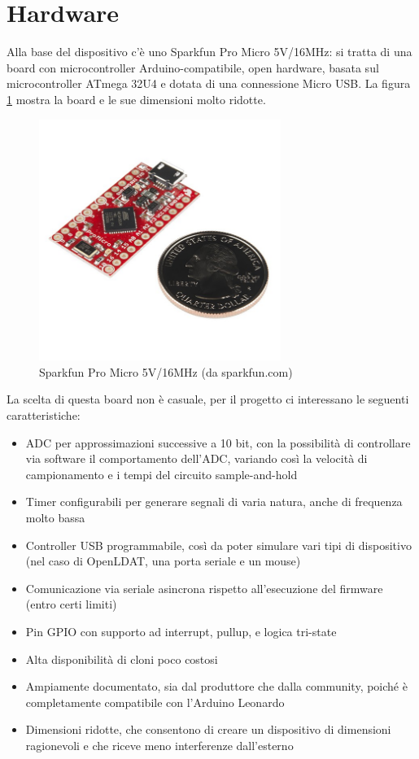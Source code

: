 \section{Hardware}
Alla base del dispositivo c'è uno Sparkfun Pro Micro 5V/16MHz: si tratta di una board con microcontroller Arduino-compatibile, open hardware, basata sul microcontroller ATmega 32U4 e dotata di una connessione Micro USB. La figura \ref{fig:sparkfun_promicro} mostra la board e le sue dimensioni molto ridotte.
\begin{figure}[h]
	\centering
	\includegraphics[width=0.7\textwidth]{Dispositivo_files/sparkfun_promicro.jpg}
	\caption{Sparkfun Pro Micro 5V/16MHz (da sparkfun.com)}
	\label{fig:sparkfun_promicro}
\end{figure}

La scelta di questa board non è casuale, per il progetto ci interessano le seguenti caratteristiche:
\begin{itemize}
	\item ADC per approssimazioni successive a 10 bit, con la possibilità di controllare via software il comportamento dell'ADC, variando così la velocità di campionamento e i tempi del circuito sample-and-hold
	\item Timer configurabili per generare segnali di varia natura, anche di frequenza molto bassa
	\item Controller USB programmabile, così da poter simulare vari tipi di dispositivo (nel caso di OpenLDAT, una porta seriale e un mouse)
	\item Comunicazione via seriale asincrona rispetto all'esecuzione del firmware (entro certi limiti)
	\item Pin GPIO con supporto ad interrupt, pullup, e logica tri-state
	\item Alta disponibilità di cloni poco costosi
	\item Ampiamente documentato, sia dal produttore che dalla community, poiché è completamente compatibile con l'Arduino Leonardo
	\item Dimensioni ridotte, che consentono di creare un dispositivo di dimensioni ragionevoli e che riceve meno interferenze dall'esterno
\end{itemize}

